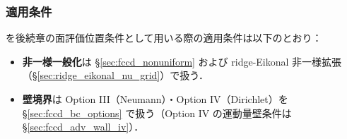 \subsubsection{適用条件}
\label{sec:fccd_poc_requirements}

{\FCCD} を後続章の面評価位置条件として用いる際の適用条件は以下のとおり：

\begin{itemize}
  \item \textbf{非一様一般化}は §\ref{sec:fccd_nonuniform}
        および ridge-Eikonal 非一様拡張（§\ref{sec:ridge_eikonal_nu_grid}）で扱う．
  \item \textbf{壁境界}は Option III（Neumann）・Option IV（Dirichlet）を
        §\ref{sec:fccd_bc_options} で扱う（Option IV の運動量壁条件は
        §\ref{sec:fccd_adv_wall_iv}）．
\end{itemize}

